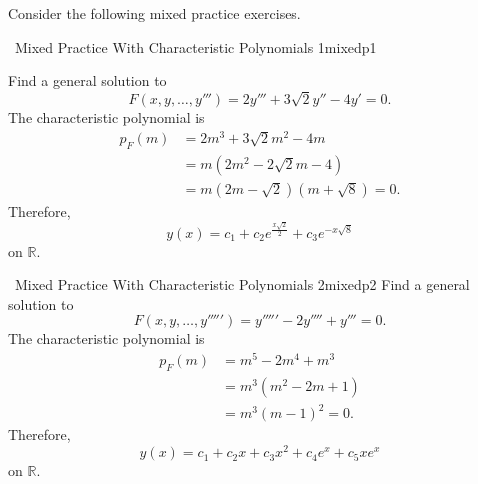         \pagebreak
        \vphantom
        \\
        \\
        Consider the following mixed practice exercises.
        \begin{example}{\Difficulty\,\Difficulty\,\,Mixed Practice With Characteristic Polynomials 1}{mixedp1}
            
            Find a general solution to
            \begin{equation*}
                F(x,y,\ldots,y''')=2y'''+3\sqrt{2}y''-4y'=0.
            \end{equation*}
            The characteristic polynomial is
            \begin{align*}
                p_F(m)&=2m^3+3\sqrt{2}m^2-4m \\
                &=m(2m^2-2\sqrt{2}m-4) \\
                &=m(2m-\sqrt{2})(m+\sqrt{8})=0.
            \end{align*}
            Therefore,
            \begin{equation*}
                y(x)=c_1+c_2e^{\frac{x\sqrt{2}}{2}}+c_3e^{-x\sqrt{8}}
            \end{equation*}
            on \(\mathbb{R}\).

        \end{example}
        \begin{example}{\Difficulty\,\Difficulty\,\,Mixed Practice With Characteristic Polynomials 2}{mixedp2}
            Find a general solution to
            \begin{equation*}
                F(x,y,\ldots,y''''')=y'''''-2y''''+y'''=0.
            \end{equation*}
            The characteristic polynomial is
            \begin{align*}
                p_F(m)&=m^5-2m^4+m^3 \\
                &=m^3(m^2-2m+1) \\
                &=m^3(m-1)^2=0.
            \end{align*}
            Therefore,
            \begin{equation*}
                y(x)=c_1+c_2x+c_3x^2+c_4e^{x}+c_5xe^x
            \end{equation*}
            on \(\mathbb{R}\).
        \end{example}
        \pagebreak
